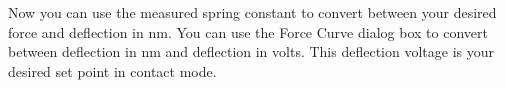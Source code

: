\documentclass{beavtex_dub_edit}
\begin{document}
Now you can use the measured spring constant to convert between your desired force and deflection in nm. You can use the Force Curve dialog box to convert between deflection in nm and deflection in volts. This deflection voltage is your desired set point in contact mode.



    
\end{document}
